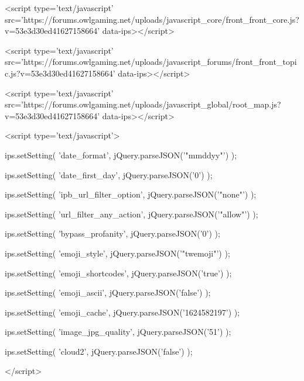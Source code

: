 <script type='text/javascript' src='https://forums.owlgaming.net/uploads/javascript_core/front_front_core.js?v=53e3d30ed41627158664' data-ips></script>


<script type='text/javascript' src='https://forums.owlgaming.net/uploads/javascript_forums/front_front_topic.js?v=53e3d30ed41627158664' data-ips></script>


<script type='text/javascript' src='https://forums.owlgaming.net/uploads/javascript_global/root_map.js?v=53e3d30ed41627158664' data-ips></script>



	<script type='text/javascript'>
		
			ips.setSetting( 'date_format', jQuery.parseJSON('"mm\/dd\/yy"') );
		
			ips.setSetting( 'date_first_day', jQuery.parseJSON('0') );
		
			ips.setSetting( 'ipb_url_filter_option', jQuery.parseJSON('"none"') );
		
			ips.setSetting( 'url_filter_any_action', jQuery.parseJSON('"allow"') );
		
			ips.setSetting( 'bypass_profanity', jQuery.parseJSON('0') );
		
			ips.setSetting( 'emoji_style', jQuery.parseJSON('"twemoji"') );
		
			ips.setSetting( 'emoji_shortcodes', jQuery.parseJSON('true') );
		
			ips.setSetting( 'emoji_ascii', jQuery.parseJSON('false') );
		
			ips.setSetting( 'emoji_cache', jQuery.parseJSON('1624582197') );
		
			ips.setSetting( 'image_jpg_quality', jQuery.parseJSON('51') );
		
			ips.setSetting( 'cloud2', jQuery.parseJSON('false') );
		
		
	</script>



